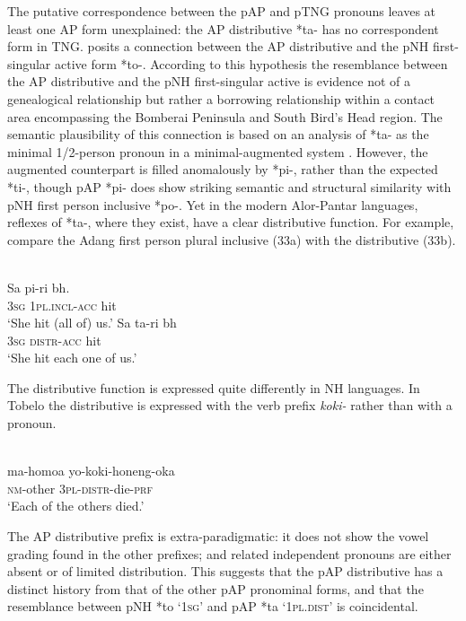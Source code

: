 The putative correspondence between the pAP and pTNG pronouns leaves at least one AP form unexplained: the AP distributive *ta- has no correspondent form in TNG. \citet{Donohue2008boundpron} posits a connection between the AP distributive and the pNH first-singular active form *to-. According to this hypothesis the resemblance between the AP distributive and the pNH first-singular active is evidence not of a genealogical relationship but rather a borrowing relationship within a contact area encompassing the Bomberai Peninsula and South Bird's Head region. The semantic plausibility of this connection is based on an analysis of *ta- as the minimal 1/2-person pronoun in a minimal-augmented system \citep{Donohue2007phonological}. However, the augmented counterpart is filled anomalously by *pi-, rather than the expected *ti-, though pAP *pi- does show striking semantic and structural similarity with pNH first person inclusive *po-. Yet in the modern Alor-Pantar languages, reflexes of *ta-, where they exist, have a clear distributive \enlargethispage{1em}
function. For example, compare the Adang first person plural inclusive (33a) with the distributive (33b).


\ea%
\label{ex:4:33}
 \\
\ea
\gll Sa pi-ri b{\textepsilon}h. \\
    \textsc{3sg} \textsc{1pl.incl-acc} hit \\
\glt `She hit (all of) us.' 
  \ex 
  \gll Sa ta-ri b{\textepsilon}h \\
  \textsc{3sg} \textsc{distr-acc} hit \\
\glt `She hit each one of us.'
  \z
\z

The distributive function is expressed quite differently in NH languages. In Tobelo the distributive is expressed with the verb prefix \textit{koki-}  rather than with a pronoun.


\ea%
\label{ex:4:34}
 \\
\gll  ma-homoa yo-koki-honeng-oka  \\
   \textsc{nm}-other \textsc{3pl-distr}-die-\textsc{prf} \\
\glt `Each of the others died.'
\z





The AP distributive prefix is extra-paradigmatic: it does not show the vowel grading found in the other prefixes; and  related independent pronouns are either absent or of limited distribution. This suggests that the pAP distributive has a distinct history from that of the other pAP pronominal forms, and that the resemblance between pNH *to `\textsc{1sg}' and pAP *ta `\textsc{1pl.dist}' is coincidental.

